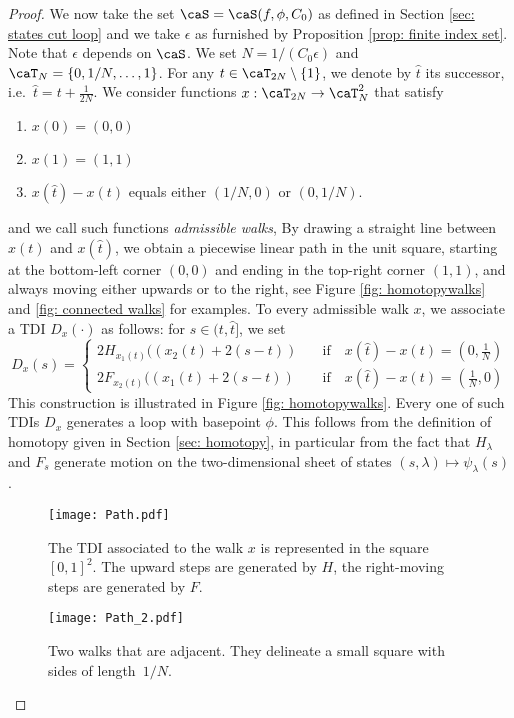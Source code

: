 \begin{proof}
	We now take the set $\caS=\caS(f,\phi,C_0)$ as defined in Section \ref{sec: states cut loop} and we take $\epsilon$ as furnished by Proposition \ref{prop: finite index set}. Note that $\epsilon$ depends on $\caS$.
	We set $N=1/(C_0\epsilon)$ and $\caT_N=\{0,1/N,\ldots,1\}$. For any $t\in\caT_{2N} \setminus \{1\}$, we denote by $\hat{t}$ its successor, i.e.\ $\hat{t}=t+\tfrac{1}{2N}$.
	We consider functions $x: \caT_{2N} \to \caT_{N}^2 $ that satisfy
	\begin{enumerate}
		\item $x(0)=(0,0)$
		\item $x(1)=(1,1)$
		\item $x(\hat{t})-x(t)$ equals either $(1/N,0)$ or $(0,1/N)$.
	\end{enumerate}  
	and we call such functions \emph{admissible walks}, 
	By drawing a straight line between $x(t)$ and $x(\hat{t})$, we obtain a piecewise linear path in the unit square, starting at the bottom-left corner $(0,0)$ and ending in the top-right corner $(1,1)$, and always moving either upwards or to the right, see Figure \ref{fig: homotopywalks} and  \ref{fig: connected walks} for examples.
	To every admissible walk $x$, we associate a TDI $D_x(\cdot)$ as follows: for $s\in (t,\hat{t}]$, we set 
	\begin{equation}
		D_x(s)= 
		\begin{cases}
			2H_{x_1(t)} ((x_2(t)+2(s-t)) &  \quad \text{if} \quad   x(\hat{t})-x(t)= (0,\tfrac{1}{N})   \\[1mm]
			2F_{x_2(t)} ((x_1(t)+2(s-t)) &  \quad \text{if} \quad  x(\hat{t})-x(t)= (\tfrac{1}{N},0)   
		\end{cases}
	\end{equation}
	This construction is illustrated in Figure \ref{fig: homotopywalks}. Every one of such TDIs $D_x$ generates a loop with basepoint $\phi$. This follows from the definition of homotopy given in Section \ref{sec: homotopy}, in particular from the fact that $H_\lambda$ and $F_s$ generate motion on the two-dimensional sheet of states $(s,\lambda)\mapsto\psi_\lambda(s)$.
	
	\begin{figure}
		\centering
		\begin{minipage}{0.475\textwidth}
			\centering
			\texttt{[image: Path.pdf]}
			\caption{The TDI associated to the walk $x$ is represented in the square $[0,1]^2$. The upward steps are generated by $H$, the right-moving steps are generated by $F$.}
			\label{fig: homotopywalks}
		\end{minipage}\hfill
		\begin{minipage}{0.475\textwidth}
			\centering
			\texttt{[image: Path\_2.pdf]}
			\caption{Two walks that are adjacent. They delineate a small square with sides of length~$1/N$.  }
			\label{fig: adjacentpaths}
		\end{minipage}
	\end{figure}
	

\end{proof}
